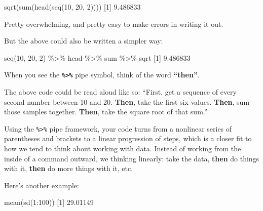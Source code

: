 \documentclass[
]{book}
\newenvironment{Shaded}{\begin{snugshade}}{\end{snugshade}}
\newcommand{\DecValTok}[1]{\textcolor[rgb]{0.00,0.00,0.81}{#1}}
\newcommand{\FloatTok}[1]{\textcolor[rgb]{0.00,0.00,0.81}{#1}}
\newcommand{\FunctionTok}[1]{\textcolor[rgb]{0.00,0.00,0.00}{#1}}
\newcommand{\NormalTok}[1]{#1}
\newcommand{\SpecialCharTok}[1]{\textcolor[rgb]{0.00,0.00,0.00}{#1}}
\begin{document}
\begin{Shaded}
\begin{Highlighting}[]
\FunctionTok{sqrt}\NormalTok{(}\FunctionTok{sum}\NormalTok{(}\FunctionTok{head}\NormalTok{(}\FunctionTok{seq}\NormalTok{(}\DecValTok{10}\NormalTok{, }\DecValTok{20}\NormalTok{, }\DecValTok{2}\NormalTok{))))}
\NormalTok{[}\DecValTok{1}\NormalTok{] }\FloatTok{9.486833}
\end{Highlighting}
\end{Shaded}

Pretty overwhelming, and pretty easy to make errors in writing it out.

But the above could also be written a simpler way:

\begin{Shaded}
\begin{Highlighting}[]
\FunctionTok{seq}\NormalTok{(}\DecValTok{10}\NormalTok{, }\DecValTok{20}\NormalTok{, }\DecValTok{2}\NormalTok{) }\SpecialCharTok{\%\textgreater{}\%}\NormalTok{ head }\SpecialCharTok{\%\textgreater{}\%}\NormalTok{ sum }\SpecialCharTok{\%\textgreater{}\%}\NormalTok{ sqrt}
\NormalTok{[}\DecValTok{1}\NormalTok{] }\FloatTok{9.486833}
\end{Highlighting}
\end{Shaded}

When you see the \textbf{\texttt{\%\textgreater{}\%}} pipe symbol, think of the word \textbf{``then''}.

The above code could be read aloud like so: ``First, get a sequence of every second number between 10 and 20. \textbf{Then}, take the first six values. \textbf{Then}, sum those samples together. \textbf{Then}, take the square root of that sum.''

Using the \texttt{\%\textgreater{}\%} pipe framework, your code turns from a nonlinear series of parentheses and brackets to a linear progression of steps, which is a closer fit to how we tend to think about working with data. Instead of working from the inside of a command outward, we thinking linearly: take the data, \textbf{then} do things with it, \textbf{then} do more things with it, etc.

Here's another example:

\begin{Shaded}
\begin{Highlighting}[]
\FunctionTok{mean}\NormalTok{(}\FunctionTok{sd}\NormalTok{(}\DecValTok{1}\SpecialCharTok{:}\DecValTok{100}\NormalTok{))}
\NormalTok{[}\DecValTok{1}\NormalTok{] }\FloatTok{29.01149}
\end{Highlighting}
\end{Shaded}
\end{document}
